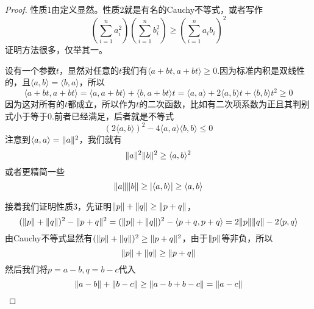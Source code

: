 \documentclass[11pt,a4paper,openany]{book}%
\theoremstyle{plain}%
\begin{document}
\begin{proof}
性质1由定义显然。性质2就是有名的Cauchy不等式，或者写作
\begin{equation}
\left( \sum_{i=1}^n a_i^2\right)\left( \sum_{i=1}^n b_i^2\right) \geq \left( \sum_{i=1}^n a_ib_i\right)^2
\end{equation}
证明方法很多，仅举其一。

设有一个参数$t$，显然对任意的$t$我们有$\langle a+bt,a+bt\rangle \geq 0$.因为标准内积是双线性的，且$\langle a,b\rangle=\langle b,a\rangle$，所以
\[
\langle a+bt,a+bt\rangle=\langle a,a+bt\rangle+\langle b,a+bt\rangle t=\langle a,a\rangle+2\langle a,b\rangle t+\langle b,b\rangle t^2 \geq 0
\]
因为这对所有的$t$都成立，所以作为$t$的二次函数，比如有二次项系数为正且其判别式小于等于0.前者已经满足，后者就是不等式
\[
(2\langle a,b\rangle)^2-4\langle a,a\rangle\langle b,b\rangle \leq 0
\]
注意到$\langle a,a\rangle=\Arrowvert a\Arrowvert ^2$，我们就有
\[
\Arrowvert a\Arrowvert ^2\Arrowvert b\Arrowvert ^2\geq \langle a, b \rangle^2
\]
或者更精简一些
\[
\Arrowvert a\Arrowvert \Arrowvert b\Arrowvert \geq \arrowvert \langle a, b \rangle\arrowvert  \geq \langle a, b \rangle
\]

接着我们证明性质3，先证明$\Arrowvert p\Arrowvert +\Arrowvert q\Arrowvert \geq \Arrowvert p+q\Arrowvert $，
\[
(\Arrowvert p\Arrowvert +\Arrowvert q\Arrowvert )^2-\Arrowvert p+q\Arrowvert ^2=(\Arrowvert p\Arrowvert +\Arrowvert q\Arrowvert )^2-\langle p+q,p+q \rangle=2\Arrowvert p\Arrowvert \Arrowvert q\Arrowvert -2\langle p, q \rangle
\]
由Cauchy不等式显然有$(\Arrowvert p\Arrowvert +\Arrowvert q\Arrowvert )^2\geq \Arrowvert p+q\Arrowvert ^2$，由于$\Arrowvert p\Arrowvert $等非负，所以
\[
\Arrowvert p\Arrowvert +\Arrowvert q\Arrowvert \geq \Arrowvert p+q\Arrowvert
\]
然后我们将$p=a-b,q=b-c$代入
\[
\Arrowvert a-b\Arrowvert +\Arrowvert b-c\Arrowvert \geq \Arrowvert a-b+b-c\Arrowvert=\Arrowvert a-c\Arrowvert
\]
\end{proof}
\end{document}
